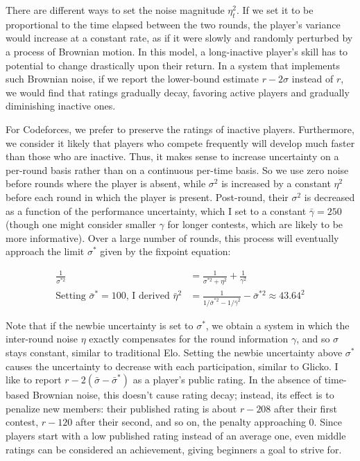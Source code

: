 There are different ways to set the noise magnitude $\eta_t^2$. If we set it to be proportional to the time elapsed between the two rounds, the player's variance would increase at a constant rate, as if it were slowly and randomly perturbed by a process of Brownian motion. In this model, a long-inactive player's skill has to potential to change drastically upon their return. In a system that implements such Brownian noise, if we report the lower-bound estimate $r-2\sigma$ instead of $r$, we would find that ratings gradually decay, favoring active players and gradually diminishing inactive ones.

For Codeforces, we prefer to preserve the ratings of inactive players. Furthermore, we consider it likely that players who compete frequently will develop much faster than those who are inactive. Thus, it makes sense to increase uncertainty on a per-round basis rather than on a continuous per-time basis. So we use zero noise before rounds where the player is absent, while $\sigma^2$ is increased by a constant $\eta^2$ before each round in which the player is present. Post-round, their $\sigma^2$ is decreased as a function of the performance uncertainty, which I set to a constant $\bar\gamma = 250$ (though one might consider smaller $\gamma$ for longer contests, which are likely to be more informative). Over a large number of rounds, this process will eventually approach the limit $\sigma^*$ given by the fixpoint equation:

\begin{align*}
\frac{1}{\sigma^{*2}} &= \frac{1}{\sigma^{*2} + \eta^2} + \frac{1}{\gamma^2}
\\ \text{Setting }\bar\sigma^*=100\text{, I derived }\bar\eta^2 &= \frac{1}{1/\bar\sigma^{*2} - 1/\bar\gamma^2} - \bar\sigma^{*2} \approx 43.64^2
\end{align*}

Note that if the newbie uncertainty is set to $\sigma^*$, we obtain a system in which the inter-round noise $\eta$ exactly compensates for the round information $\gamma$, and so $\sigma$ stays constant, similar to traditional Elo. Setting the newbie uncertainty above $\sigma^*$ causes the uncertainty to decrease with each participation, similar to Glicko. I like to report $r-2(\bar\sigma-\bar\sigma^*)$ as a player's public rating. In the absence of time-based Brownian noise, this doesn't cause rating decay; instead, its effect is to penalize new members: their published rating is about $r - 208$ after their first contest, $r - 120$ after their second, and so on, the penalty approaching $0$. Since players start with a low published rating instead of an average one, even middle ratings can be considered an achievement, giving beginners a goal to strive for. 

